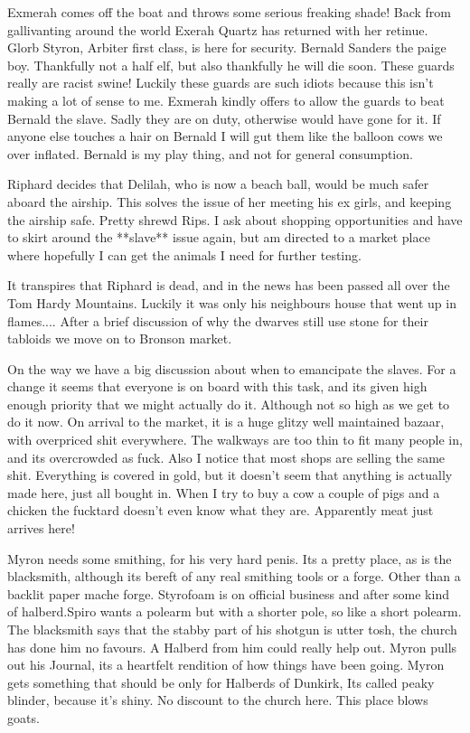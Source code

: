 \begin{multicols}{2}
Exmerah comes off the boat and throws some serious freaking shade! Back from gallivanting around the world Exerah Quartz has returned with her retinue. Glorb Styron, Arbiter first class, is here for security. Bernald Sanders the paige boy. Thankfully not a half elf, but also thankfully he will die soon. These guards really are racist swine! Luckily these guards are such idiots because this isn’t making a lot of sense to me. Exmerah kindly offers to allow the guards to beat Bernald the slave. Sadly they are on duty, otherwise would have gone for it. If anyone else touches a hair on Bernald I will gut them like the balloon cows we over inflated. Bernald is my play thing, and not for general consumption.\medskip

Riphard decides that Delilah, who is now a beach ball, would be much safer aboard the airship. This solves the issue of her meeting his ex girls, and keeping the airship safe. Pretty shrewd Rips. I ask about shopping opportunities and have to skirt around the **slave** issue again, but am directed to a market place where hopefully I can get the animals I need for further testing.\medskip

It transpires that Riphard is dead, and in the news has been passed all over the Tom Hardy Mountains. Luckily it was only his neighbours house that went up in flames.... After a brief discussion of why the dwarves still use stone for their tabloids we move on to Bronson market.\medskip

On the way we have a big discussion about when to emancipate the slaves. For a change it seems that everyone is on board with this task, and its given high enough priority that we might actually do it. Although not so high as we get to do it now. On arrival to the market, it is a huge glitzy well maintained bazaar, with overpriced shit everywhere. The walkways are too thin to fit many people in, and its overcrowded as fuck. Also I notice that most shops are selling the same shit. Everything is covered in gold, but it doesn't seem that anything is actually made here, just all bought in. When I try to buy a cow a couple of pigs and a chicken the fucktard doesn't even know what they are. Apparently meat just arrives here!\medskip

Myron needs some smithing, for his very hard penis. Its a pretty place, as is the blacksmith, although its bereft of any real smithing tools or a forge. Other than a backlit paper mache forge. Styrofoam is on official business and after some kind of halberd.Spiro wants a polearm but with a shorter pole, so like a short polearm. The blacksmith says that the stabby part of his shotgun is utter tosh, the church has done him no favours. A Halberd from him could really help out. Myron pulls out his Journal, its a heartfelt rendition of how things have been going. Myron gets something that should be only for Halberds of Dunkirk, Its called peaky blinder, because it's shiny. No discount to the church here. This place blows goats.\medskip


\end{multicols}
